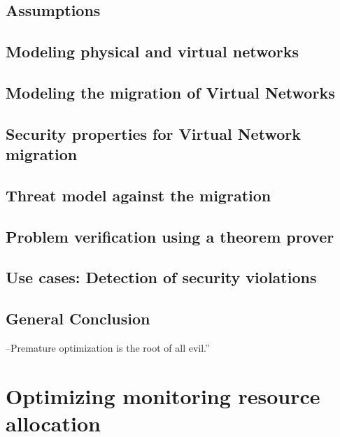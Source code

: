 \documentclass[a4paper, 11pt]{report}
\theoremstyle{definition}
\begin{document}
\section{Assumptions}


\section{Modeling physical and virtual networks}


\newpage
\section{Modeling the migration of Virtual Networks}


\newpage
\section{Security properties for Virtual Network migration}




\section{Threat model against the migration}


\section{Problem verification using a theorem prover}


\section{Use cases: Detection of security violations}


\newpage
\section{General Conclusion}


\newpage
\begin{savequote}
--Premature optimization is the root of all evil.”
\end{savequote}
\chapter{Optimizing monitoring resource allocation}
\label{sec:RAprob}

\end{document}
